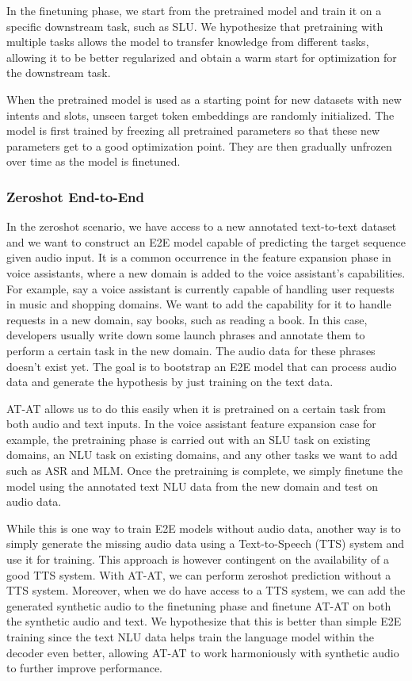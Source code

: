 \documentclass[letterpaper]{article} \usepackage{aaai21}  \usepackage{times}  \usepackage{helvet} \usepackage{courier}  \usepackage[hyphens]{url}  \usepackage{graphicx} \usepackage{booktabs}
\begin{document}
In the finetuning phase, we start from the pretrained model and train it on a specific downstream task, such as SLU. We hypothesize that pretraining with multiple tasks allows the model to transfer knowledge from different tasks, allowing it to be better regularized and obtain a warm start for optimization for the downstream task.

When the pretrained model is used as a starting point for new datasets with new intents and slots, unseen target token embeddings are randomly initialized. The model is first trained by freezing all pretrained parameters so that these new parameters get to a good optimization point. They are then gradually unfrozen over time as the model is finetuned.

\subsubsection{Zeroshot End-to-End}

In the zeroshot scenario, we have access to a new annotated text-to-text dataset and we want to construct an E2E model capable of predicting the target sequence given audio input. It is a common occurrence in the feature expansion phase in voice assistants, where a new domain is added to the voice assistant's capabilities. For example, say a voice assistant is currently capable of handling user requests in music and shopping domains. We want to add the capability for it to handle requests in a new domain, say books, such as reading a book. In this case, developers usually write down some launch phrases and annotate them to perform a certain task in the new domain. The audio data for these phrases doesn't exist yet. The goal is to bootstrap an E2E model that can process audio data and generate the hypothesis by just training on the text data.

AT-AT allows us to do this easily when it is pretrained on a certain task from both audio and text inputs. In the voice assistant feature expansion case for example, the pretraining phase is carried out with an SLU task on existing domains, an NLU task on existing domains, and any other tasks we want to add such as ASR and MLM. Once the pretraining is complete, we simply finetune the model using the annotated text NLU data from the new domain and test on audio data.

While this is one way to train E2E models without audio data, another way is to simply generate the missing audio data using a Text-to-Speech (TTS) system and use it for training. This approach is however contingent on the availability of a good TTS system. With AT-AT, we can perform zeroshot prediction without a TTS system. Moreover, when we do have access to a TTS system, we can add the generated synthetic audio to the finetuning phase and finetune AT-AT on both the synthetic audio and text. We hypothesize that this is better than simple E2E training since the text NLU data helps train the language model within the decoder even better, allowing AT-AT to work harmoniously with synthetic audio to further improve performance.  
\end{document}
